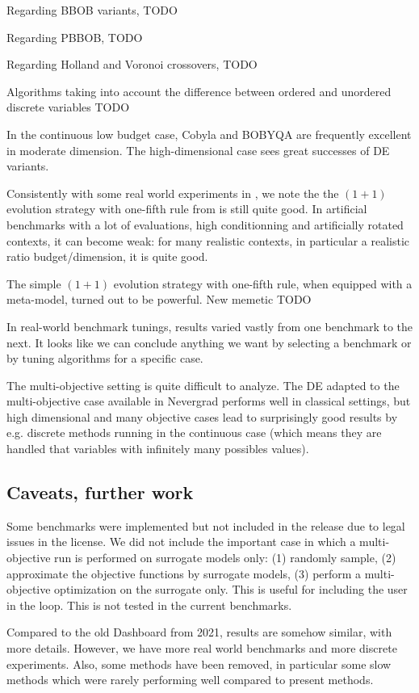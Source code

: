Regarding BBOB variants, TODO

Regarding PBBOB, TODO

Regarding Holland and Voronoi crossovers, TODO

Algorithms taking into account the difference between ordered and unordered discrete variables TODO

In the continuous low budget case, Cobyla and BOBYQA are frequently excellent in moderate dimension. The high-dimensional case sees great successes of DE variants.

Consistently with some real world experiments in \cite{micropredictions1,micropredictions2}, we note the the $(1+1)$ evolution strategy with one-fifth rule from \cite{rechenberg73} is still quite good. In artificial benchmarks with a lot of evaluations, high conditionning and artificially rotated contexts, it can become weak: for many realistic contexts, in particular a realistic ratio budget/dimension, it is quite good.

The simple $(1+1)$ evolution strategy with one-fifth rule, when equipped with a meta-model, turned out to be powerful.
New memetic TODO

In real-world benchmark tunings, results varied vastly from one benchmark to the next.  It looks like we can conclude
anything we want by selecting a benchmark or by tuning algorithms for a specific case.

The multi-objective setting is quite difficult to analyze. The DE adapted to the multi-objective case available in
Nevergrad performs well in classical settings, but high dimensional and many objective cases lead to surprisingly good
results  by e.g. discrete methods running in the continuous case (which means they are handled that variables with
infinitely many possibles values).

\subsection{Caveats, further work}
Some benchmarks were implemented but not included in the release due to legal issues in the license. 
We did not include the important case in which a multi-objective run is performed on surrogate models only: (1) randomly sample, (2) approximate the objective functions by surrogate models, (3) perform a multi-objective optimization on the surrogate only. This is useful for including the user in the loop. This is not tested in the current benchmarks.

Compared to the old Dashboard from 2021, results are somehow similar, with more details. However, we have more real world benchmarks and more discrete experiments. Also,
some methods have been removed, in particular some slow methods which were rarely performing well compared to present methods.
